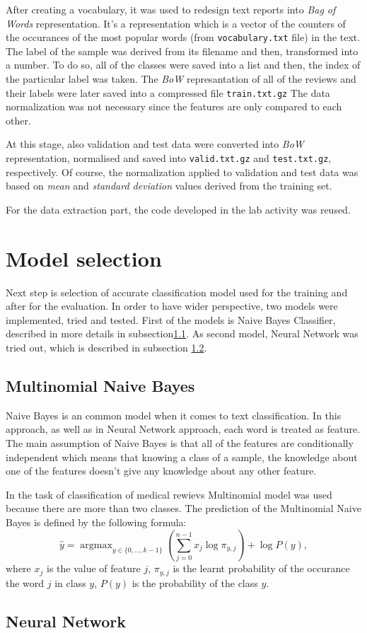 \documentclass{article}
\DeclareMathOperator*{\argmax}{argmax}
\begin{document}
After creating a vocabulary, it was used to redesign text reports into \textit{Bag of Words} representation. It's a representation which is a vector of the counters of the occurances of the most popular words (from \texttt{vocabulary.txt} file) in the text. The label of the sample was derived from its filename and then, transformed into a number. To do so, all of the classes were saved into a list and then, the index of the particular label was taken. The \textit{BoW} represantation of all of the reviews and their labels were later saved into a compressed file \texttt{train.txt.gz} The data normalization was not necessary since the features are only compared to each other.

At this stage, also validation and test data were converted into \textit{BoW} representation, normalised and saved into \texttt{valid.txt.gz} and \texttt{test.txt.gz}, respectively. Of course, the normalization applied to validation and test data was based on \textit{mean} and \textit{standard deviation} values derived from the training set.

For the data extraction part, the code developed in the lab activity was reused.

\section{Model selection}
Next step is selection of accurate classification model used for the training and after for the evaluation. In order to have wider perspective, two models were implemented, tried and tested. First of the models is Naive Bayes Classifier, described in more details in subsection\ref{subsection:naive_bayes}. As second model, Neural Network was tried out, which is described in subsection \ref{subsection:neural_network}.

\subsection{Multinomial Naive Bayes}
\label{subsection:naive_bayes}
Naive Bayes is an common model when it comes to text classification. In this approach, as well as in Neural Network approach, each word is treated as feature. The main assumption of Naive Bayes is that all of the features are conditionally independent which means that knowing a class of a sample, the knowledge about one of the features doesn't give any knowledge about any other feature.

In the task of classification of medical rewievs Multinomial model was used because there are more than two classes. The prediction of the Multinomial Naive Bayes is defined by the following formula:
\begin{equation}
    \hat{y} = \argmax_{y \in \{0, ..., k-1\}} \left( \sum^{n - 1}_{j = 0} x_j \log \pi_{y, j} \right) + \log P(y),
\end{equation}
where $x_j$ is the value of feature $j$, $\pi_{y, j}$ is the learnt probability of the occurance the word $j$ in class $y$, $P(y)$ is the probability of the class $y$.

\subsection{Neural Network}
\label{subsection:neural_network}
\end{document}
